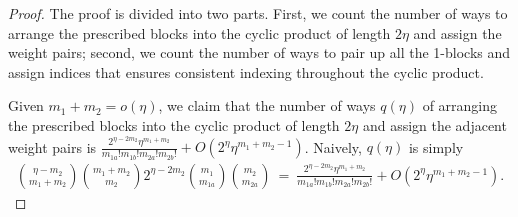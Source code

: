 \documentclass[11pt,reqno]{amsart}
\numberwithin{equation}{section}
\theoremstyle{plain}
\begin{document}
\begin{proof}
The proof is divided into two parts. First, we count the number of ways to arrange the prescribed blocks into the cyclic product of length $2\eta$ and assign the weight pairs; second, we count the number of ways to pair up all the 1-blocks and assign indices that ensures consistent indexing throughout the cyclic product.

Given $m_1+m_2=o(\eta)$, we claim that the number of ways $q(\eta)$ of arranging the prescribed blocks into the cyclic product of length $2\eta$ and assign the adjacent weight pairs is $\frac{2^{\eta-2m_2}\eta^{m_1+m_2}}{m_{1a}!m_{1b}!m_{2a}!m_{2b}!}+O(2^\eta\eta^{m_1+m_2-1})$. 
Naively, $q(\eta)$ is simply
\begin{align}
\binom{\eta-m_2}{m_1+m_2}\binom{m_1+m_2}{m_2}2^{\eta-2m_2}\binom{m_1}{m_{1a}}\binom{m_2}{m_{2a}} \ = \ \frac{2^{\eta-2m_2}\eta^{m_1+m_2}}{m_{1a}!m_{1b}!m_{2a}!m_{2b}!}+O(2^\eta\eta^{m_1+m_2-1}).
\end{align}

\end{proof}
\end{document}
